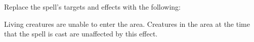 Replace the spell's targets and effects with the following:
\begin{spellcontent}

\begin{augmenttargetinginfo}



\end{augmenttargetinginfo}


\begin{augmenteffects}



\spelleffect
Living creatures are unable to enter the area.
Creatures in the area at the time that the spell is cast are unaffected by this effect.








\end{augmenteffects}

\end{spellcontent}




